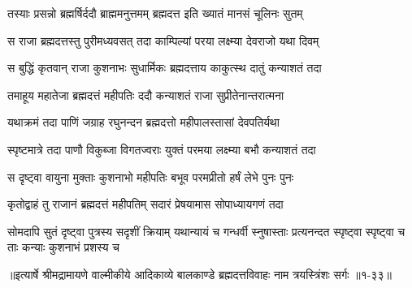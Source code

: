 \twolineshloka
{तस्याः प्रसन्नो ब्रह्मर्षिर्ददौ ब्राह्ममनुत्तमम्}
{ब्रह्मदत्त इति ख्यातं मानसं चूलिनः सुतम्} %

\twolineshloka
{स राजा ब्रह्मदत्तस्तु पुरीमध्यवसत् तदा}
{काम्पिल्यां परया लक्ष्म्या देवराजो यथा दिवम्} %

\twolineshloka
{स बुद्धिं कृतवान् राजा कुशनाभः सुधार्मिकः}
{ब्रह्मदत्ताय काकुत्स्थ दातुं कन्याशतं तदा} %

\twolineshloka
{तमाहूय महातेजा ब्रह्मदत्तं महीपतिः}
{ददौ कन्याशतं राजा सुप्रीतेनान्तरात्मना} %

\twolineshloka
{यथाक्रमं तदा पाणिं जग्राह रघुनन्दन}
{ब्रह्मदत्तो महीपालस्तासां देवपतिर्यथा} %

\twolineshloka
{स्पृष्टमात्रे तदा पाणौ विकुब्जा विगतज्वराः}
{युक्तं परमया लक्ष्म्या बभौ कन्याशतं तदा} %

\twolineshloka
{स दृष्ट्वा वायुना मुक्ताः कुशनाभो महीपतिः}
{बभूव परमप्रीतो हर्षं लेभे पुनः पुनः} %

\twolineshloka
{कृतोद्वाहं तु राजानं ब्रह्मदत्तं महीपतिम्}
{सदारं प्रेषयामास सोपाध्यायगणं तदा} %

\threelineshloka
{सोमदापि सुतं दृष्ट्वा पुत्रस्य सदृशीं क्रियाम्}
{यथान्यायं च गन्धर्वी स्नुषास्ताः प्रत्यनन्दत}
{स्पृष्ट्वा स्पृष्ट्वा च ताः कन्याः कुशनाभं प्रशस्य च} %


॥इत्यार्षे श्रीमद्रामायणे वाल्मीकीये आदिकाव्ये बालकाण्डे ब्रह्मदत्तविवाहः नाम त्रयस्त्रिंशः सर्गः ॥१-३३॥
